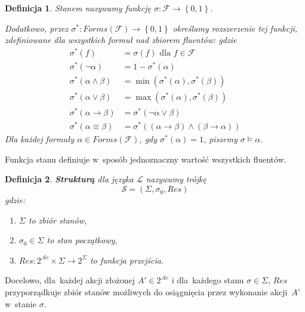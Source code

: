 \documentclass[11pt,a4paper]{article}
\newtheorem{defn}{Definicja}
\begin{document}
\begin{defn}
    \label{defn:state}
    Stanem nazywamy funkcję $\sigma : \mathcal{F} \rightarrow \left\{0,1\right\}$.

    Dodatkowo, przez $\sigma^{*} : Forms(\mathcal{F}) \rightarrow \left\{0,1\right\}$ określamy rozszerzenie tej funkcji, zdefiniowane dla wszystkich formuł nad zbiorem fluentów:
    gdzie
    \begin{align*}
        \sigma^{*}\left(f\right) &= \sigma\left(f\right) \text{ dla } f \in \mathcal{F} \\
        \sigma^{*}\left(\neg \alpha\right) &= 1 - \sigma^{*}\left(\alpha\right) \\
        \sigma^{*}\left(\alpha \land \beta\right) &= \min \left(\sigma^{*}\left(\alpha\right),\sigma^{*}\left(\beta\right)\right) \\
        \sigma^{*}\left(\alpha \lor \beta\right) &= \max \left(\sigma^{*}\left(\alpha\right),\sigma^{*}\left(\beta\right)\right) \\
        \sigma^{*}\left(\alpha \rightarrow \beta\right) &= \sigma^{*}\left(\neg \alpha \lor \beta\right) \\
        \sigma^{*}\left(\alpha \equiv \beta\right) &= \sigma^{*}\left(\left(\alpha \rightarrow \beta\right)\land\left(\beta \rightarrow \alpha\right)\right)
    \end{align*}
    Dla każdej formuły $\alpha \in Forms\left(\mathcal{F}\right)$, gdy $\sigma^*\left(\alpha\right) = 1$, piszemy $\sigma \models \alpha$.
\end{defn}

Funkcja stanu definiuje w~sposób jednoznaczny wartość wszystkich fluentów.

\begin{defn}
    \label{defn:structure}
    \textbf{Strukturą} dla języka $\mathcal{L}$ nazywamy trójkę
    $$\mathcal{S} = \left(\Sigma, \sigma_0, Res\right)$$
    gdzie:
    \begin{enumerate}
        \item $\Sigma$ to zbiór stanów,
        \item $\sigma_0 \in \Sigma$ to stan początkowy,
        \item $Res : 2^{\mathcal{A}c} \times \Sigma \rightarrow 2^\Sigma$ to funkcja przejścia.
    \end{enumerate}
\end{defn}

Docelowo, dla~każdej akcji złożonej $A' \in 2^{\mathcal{A}c}$ i dla~każdego stanu $\sigma \in \Sigma$, $Res$ przyporządkuje zbiór stanów możliwych do osiągnięcia przez wykonanie akcji~$A'$ w~stanie $\sigma$.
\end{document}
